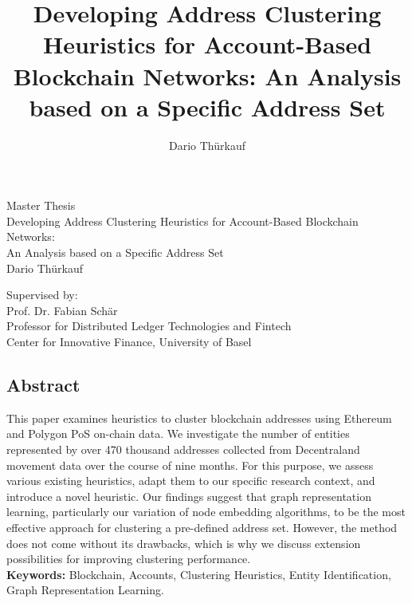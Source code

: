\documentclass[12pt,a4paper,titlepage,oneside,english]{article}
\title{Developing Address Clustering Heuristics for Account-Based Blockchain Networks: An Analysis based on a Specific Address Set}
\author{Dario Thürkauf}
\begin{document}
\begin{titlepage}
\begin{center}
\vspace{1em}
\large{Master Thesis}\\
\LARGE Developing Address Clustering Heuristics for Account-Based Blockchain Networks:\\ An Analysis based on a Specific Address Set \\
\Large \vspace{1em}
Dario Thürkauf
\end{center}

\vspace{1em}
\normalsize
\begin{flushleft}
Supervised by: \\
Prof. Dr. Fabian Schär \\ 
Professor for Distributed Ledger Technologies and Fintech \\
Center for Innovative Finance, University of Basel
\end{flushleft}

\vspace{1em}
\onehalfspacing
\begin{center}
\section*{Abstract}
\end{center}
This paper examines heuristics to cluster blockchain addresses using Ethereum and Polygon PoS on-chain data. We investigate the number of entities represented by over 470 thousand addresses collected from Decentraland movement data over the course of nine months. For this purpose, we assess various existing heuristics, adapt them to our specific research context, and introduce a novel heuristic. Our findings suggest that graph representation learning, particularly our variation of node embedding algorithms, to be the most effective approach for clustering a pre-defined address set. However, the method does not come without its drawbacks, which is why we discuss extension possibilities for improving clustering performance. \\

\vfill
\textbf{Keywords:} Blockchain, Accounts, Clustering Heuristics, Entity Identification, Graph Representation Learning.\\
\end{titlepage}
\end{document}
